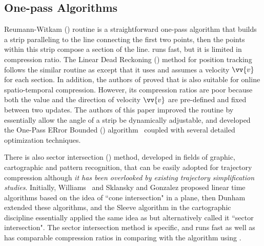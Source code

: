 
\vspace{-1ex}
\subsection{One-pass Algorithms}

Reumann-Witkam (\rwa) routine \cite{Reumann:Strip} is a straightforward one-pass algorithm that builds a strip paralleling to the line connecting the first two points, then the points within this strip compose a section of the line. \rwa runs fast, but it is limited in compression ratio.
%
The Linear Dead Reckoning (\ldr) method \cite{Lange:Tracking} for position tracking follows the similar routine as \rwa except that it uses \sed and assumes a velocity ${\vv{v}}$ for each section. In addition, the authors of \cite{Trajcevski:DDR} proved that \ldr is also suitable for online spatio-temporal compression. %
However, its compression ratios are poor because both the value and the direction of velocity ${\vv{v}}$ are pre-defined and fixed between two updates.
%
The authors of this paper improved the \rwa routine by essentially allow the angle of a strip be dynamically adjustable, and developed the One-Pass ERror Bounded (\operb) algorithm~\cite{Lin:Operb} coupled with several detailed optimization techniques.

There is also {sector intersection (\siped)} method, developed in fields of graphic, cartographic and pattern recognition, that can be easily adopted for trajectory compression although \textit{it has been overlooked by existing trajectory simplification studies}.
Initially, Williams~\cite{Williams:Longest} and Sklansky and Gonzalez \cite{Sklansky:Cone} proposed linear time algorithms based on the idea of ``cone intersection" in a plane, then Dunham \cite{Dunham:Cone} extended these algorithms, and the Sleeve algorithm \cite{Zhao:Sleeve} in the cartographic discipline
essentially applied the same idea as \siped but alternatively called it ``sector intersection".
The sector intersection method is \ped specific, and runs fast as well as has comparable compression ratios in comparing with the \dpa algorithm using \ped.
%
%

